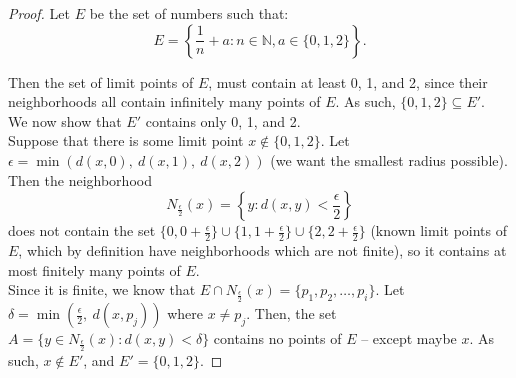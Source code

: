 \documentclass[10pt]{article}
\theoremstyle{definition}
\theoremstyle{plain}
\newcommand{\N}{\mathbb{N}}
\newcommand{\Z}{\mathbb{Z}}
\newcommand{\R}{\mathbb{R}}
\begin{document}
\begin{proof}
Let $E$ be the set of numbers such that:
$$E = \left\{\frac{1}{n} + a: n\in\N, a\in\{0,1,2\} \right\}.$$

Then the set of limit points of $E$, must contain at least 0, 1, and 2, since their neighborhoods all contain infinitely many points of $E$. As such, $\{0,1,2\}\subseteq E'$. \\

We now show that $E'$ contains only 0, 1, and 2. \\

Suppose that there is some limit point $x\not\in\{0,1,2\}$. Let $\epsilon = \min(d(x,0),\ d(x,1),\ d(x,2))$ (we want the smallest radius possible). Then the neighborhood $$N_\frac{\epsilon}{2} (x) = \left\{y: d(x,y) < \frac{\epsilon}{2}\right\}$$
does not contain the set $\{0, 0+\frac{\epsilon}{2}\}\cup\{1, 1+\frac{\epsilon}{2}\}\cup\{2, 2+\frac{\epsilon}{2}\}$ (known limit points of $E$, which by definition have neighborhoods which are not finite), so it contains at most finitely many points of $E$. \\

Since it is finite, we know that $E\cap N_\frac{\epsilon}{2} (x) = \{p_1, p_2, \dots, p_i\}$. Let $\delta = \min(\frac{\epsilon}{2},\ d(x,p_j))$ where $x\neq p_j$. Then, the set $A=\{y\in N_\frac{\epsilon}{2} (x): d(x,y) < \delta\}$ contains no points of $E$ -- except maybe $x$. As such, $x\not\in E'$, and $E' = \{0,1,2\}$.







\end{proof}
\end{document}
